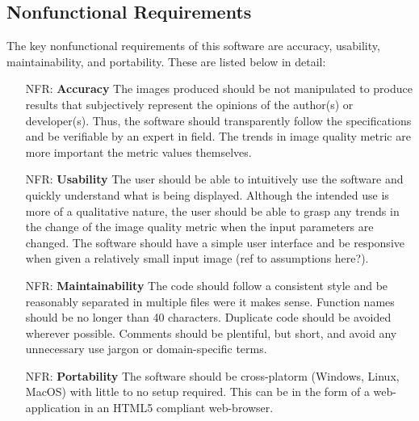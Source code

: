 \documentclass[12pt]{article}
\newcounter{nfrnum} %
\begin{document}
\subsection{Nonfunctional Requirements}

The key nonfunctional requirements of this software are accuracy, usability, 
maintainability, and portability. These are listed below in detail:

\noindent \begin{itemize}

\item[NFR\refstepcounter{nfrnum}\thenfrnum \label{NFR_Accuracy}:]
  \textbf{Accuracy} The images produced should be not manipulated to produce 
  results that subjectively represent the opinions of the author(s) or 
  developer(s). Thus, the software should transparently follow the 
  specifications and be verifiable by an expert in field. The trends in image 
  quality metric are more important the metric values themselves.

\item[NFR\refstepcounter{nfrnum}\thenfrnum \label{NFR_Usability}:] \textbf{Usability} The user should be able to intuitively use the 
  software and quickly understand what is being displayed. Although the intended 
  use is more of a qualitative nature, the user should be able to grasp any 
  trends in the change of the image quality metric when the input parameters are 
  changed. The software should have a simple user interface and be responsive 
  when given a relatively small input image (ref to assumptions here?).

\item[NFR\refstepcounter{nfrnum}\thenfrnum \label{NFR_Maintainability}:]
  \textbf{Maintainability} The code should follow a consistent style and
  be reasonably separated in multiple files were it makes sense. Function names 
  should be no longer than 40 characters. Duplicate code should be avoided 
  wherever possible. Comments should be plentiful, but short, and avoid any 
  unnecessary use jargon or domain-specific terms.

\item[NFR\refstepcounter{nfrnum}\thenfrnum \label{NFR_Portability}:]
  \textbf{Portability} The software should be cross-platorm (Windows, Linux, 
  MacOS) with little to no setup required. This can be in the form of a 
  web-application in an HTML5 compliant web-browser.

\end{itemize}
\end{document}
